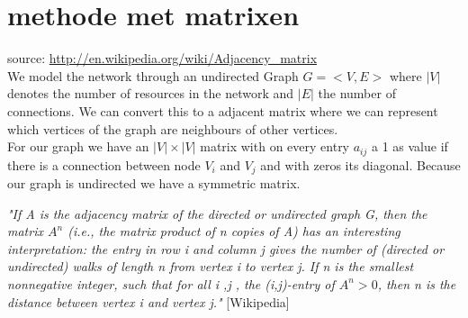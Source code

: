 \section{methode met matrixen}



source: \url{http://en.wikipedia.org/wiki/Adjacency_matrix} \\
We model the network through an undirected Graph $G = < V, E> $ where $|V|$ denotes the number of resources in the network and $|E|$ the number of connections. We can convert this to a adjacent matrix where we can represent which vertices of the graph are neighbours of other vertices. \\
For our graph we have an $|V| \times |V|$ matrix with on every entry $a_{ij}$ a 1 as value if there is a connection between node $V_{i}$ and $V_{j}$ and with zeros its diagonal. Because our graph is undirected we have a symmetric matrix. 

\textit{"If \textit{A} is the adjacency matrix of the directed or undirected graph \textit{G}, then the matrix $A^{n}$ (i.e., the matrix product of n copies of \textit{A}) has an interesting interpretation: the entry in row i and column j gives the number of (directed or undirected) walks of length n from vertex i to vertex j. If n is the smallest nonnegative integer, such that for all i ,j , the (i,j)-entry of $A^{n} > 0$, then n is the distance between vertex i and vertex j."} [Wikipedia]


